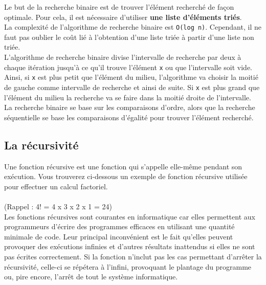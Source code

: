 Le but de la recherche binaire est de trouver l'élément recherché de façon optimale. Pour cela, il est nécessaire d'utiliser \textbf{une liste d'éléments triés}.\\

La complexité de l'algorithme de recherche binaire est \lstinline{O(log n)}. Cependant, il ne faut pas oublier le coût lié à l'obtention d'une liste triée à partir d'une liste non triée.\\

L'algorithme de recherche binaire divise l'intervalle de recherche par deux à chaque itération jusqu'à ce qu'il trouve l'élément \lstinline{x} ou que l'intervalle soit vide.\\

Ainsi, si \lstinline{x} est plus petit que l'élément du milieu, l'algorithme va choisir la moitié de gauche comme intervalle de recherche et ainsi de suite. Si \lstinline{x} est plus grand que l'élément du milieu la recherche va se faire dans la moitié droite de l'intervalle.\\

La recherche binaire se base sur les comparaisons d'ordre, alors que la recherche séquentielle se base les comparaisons d'égalité pour trouver l'élément recherché.\\

\subsection{La récursivité}

Une fonction récursive est une fonction qui s'appelle elle-même pendant son exécution. Vous trouverez ci-dessous un exemple de fonction récursive utilisée pour effectuer un calcul factoriel.\\\\
(Rappel : 4! = 4 x 3 x 2 x 1 = 24)\\



Les fonctions récursives sont courantes en informatique car elles permettent aux programmeurs d'écrire des programmes efficaces en utilisant une quantité minimale de code. Leur principal inconvénient est le fait qu'elles peuvent provoquer des exécutions infinies et d'autres résultats inattendus si elles ne sont pas écrites correctement. Si la fonction n'inclut pas les cas permettant d'arrêter la récursivité, celle-ci se répétera à l'infini, provoquant le plantage du programme ou, pire encore, l'arrêt de tout le système informatique.\\
   
